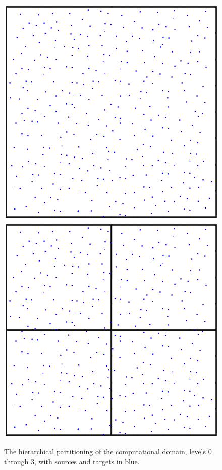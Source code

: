 \documentclass[11pt, oneside]{article}   	%
\begin{document}
\begin{figure}[h]
\caption{The hierarchical partitioning of the computational domain, levels $0$ through $3$, with sources and targets in blue.}
\label{fig:4}
\centering
\includegraphics[scale=0.25]{b0}
\includegraphics[scale=0.25]{b1}

\end{figure}
\end{document}

